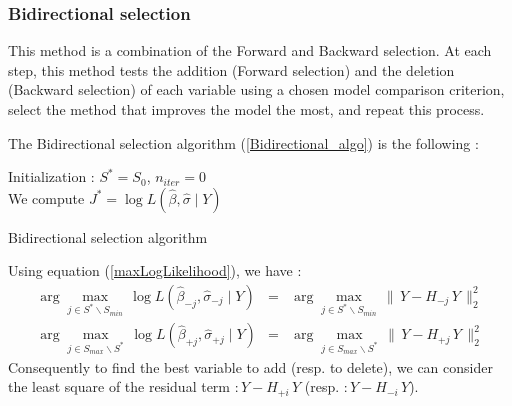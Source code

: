\newpage
\subsubsection{Bidirectional selection}

This method is a combination of the Forward and Backward selection. At each step, this method tests
the addition (Forward selection) and the deletion (Backward selection) of each variable using a chosen model comparison criterion, 
select the method that improves the model the most, and repeat this process. 

The Bidirectional selection algorithm (\ref{Bidirectional_algo}) is the following : 
\begin{algorithm}
\label{Bidirectional_algo}
Initialization : $S^* = S_0$, $n_{iter} = 0 $\\
We compute $J^* = \log L(\hat{\beta},\hat{\sigma}\mid Y)$  \\
\caption{Bidirectional selection algorithm }
\end{algorithm}

Using equation (\ref{maxLogLikelihood}), we have : 
 \begin{eqnarray}
 \arg   \displaystyle\max_{j \in S^*\backslash S_{min}}\,  \log L(\hat{\beta}_{-j},\hat{\sigma}_{-j}\mid Y) &=& 
\arg \displaystyle\max_{j \in S^*\backslash S_{min}}\, \|\,Y-H_{-j}\,Y\,\|^2_2  \\
\arg   \displaystyle\max_{j \in S_{max} \backslash S^*}\,  \log L(\hat{\beta}_{+j},\hat{\sigma}_{+j}\mid Y)  &=& 
\arg \displaystyle\max_{j \in S_{max} \backslash S^*}\, \|\,Y-H_{+j}\,Y\,\|^2_2
 \end{eqnarray}
 Consequently to find the best variable to add (resp. to delete), we can consider the least square of the residual term $:Y-H_{+i}\,Y$
 (resp.  $:Y-H_{-i}\,Y$). 

